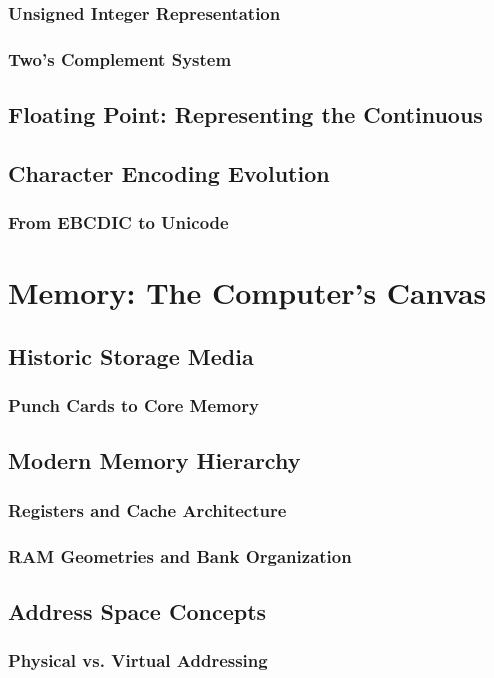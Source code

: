 \documentclass[12pt, oneside]{book}
\begin{document}
	\subsection{Unsigned Integer Representation}
	\subsection{Two's Complement System}
	\section{Floating Point: Representing the Continuous}
	\section{Character Encoding Evolution}
	\subsection{From EBCDIC to Unicode}
	
	\chapter{Memory: The Computer's Canvas}
	\section{Historic Storage Media}
	\subsection{Punch Cards to Core Memory}
	\section{Modern Memory Hierarchy}
	\subsection{Registers and Cache Architecture}
	\subsection{RAM Geometries and Bank Organization}
	\section{Address Space Concepts}
	\subsection{Physical vs. Virtual Addressing}
	
\end{document}
